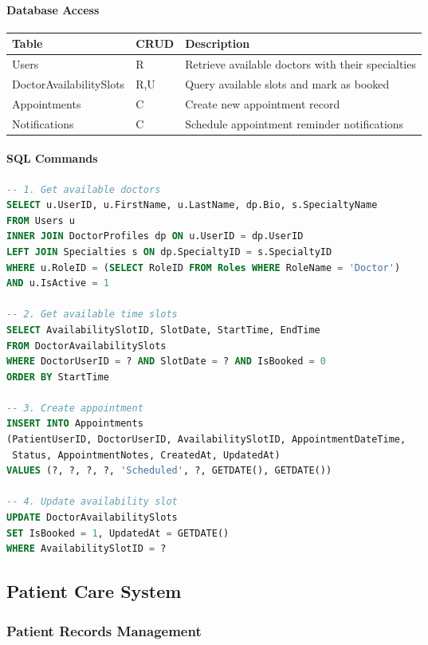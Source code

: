 \documentclass[12pt,a4paper]{article}
\begin{document}
\paragraph{Database Access}

\begin{longtable}{|p{3cm}|p{2cm}|p{9cm}|}
\hline
\textbf{Table} & \textbf{CRUD} & \textbf{Description} \\
\hline
Users & R & Retrieve available doctors with their specialties \\
\hline
DoctorAvailabilitySlots & R,U & Query available slots and mark as booked \\
\hline
Appointments & C & Create new appointment record \\
\hline
Notifications & C & Schedule appointment reminder notifications \\
\hline
\end{longtable}

\paragraph{SQL Commands}

\begin{lstlisting}[language=SQL]
-- 1. Get available doctors
SELECT u.UserID, u.FirstName, u.LastName, dp.Bio, s.SpecialtyName
FROM Users u
INNER JOIN DoctorProfiles dp ON u.UserID = dp.UserID
LEFT JOIN Specialties s ON dp.SpecialtyID = s.SpecialtyID
WHERE u.RoleID = (SELECT RoleID FROM Roles WHERE RoleName = 'Doctor')
AND u.IsActive = 1

-- 2. Get available time slots
SELECT AvailabilitySlotID, SlotDate, StartTime, EndTime
FROM DoctorAvailabilitySlots
WHERE DoctorUserID = ? AND SlotDate = ? AND IsBooked = 0
ORDER BY StartTime

-- 3. Create appointment
INSERT INTO Appointments 
(PatientUserID, DoctorUserID, AvailabilitySlotID, AppointmentDateTime, 
 Status, AppointmentNotes, CreatedAt, UpdatedAt)
VALUES (?, ?, ?, ?, 'Scheduled', ?, GETDATE(), GETDATE())

-- 4. Update availability slot
UPDATE DoctorAvailabilitySlots 
SET IsBooked = 1, UpdatedAt = GETDATE()
WHERE AvailabilitySlotID = ?
\end{lstlisting}

\subsection{Patient Care System}

\subsubsection{Patient Records Management}
\end{document}
